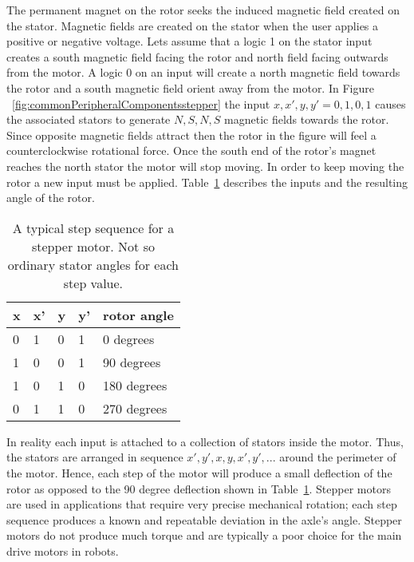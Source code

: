 The permanent magnet on the rotor seeks the induced magnetic field
created on the stator.  Magnetic fields are created on the stator
when the user applies a positive or negative voltage.  Lets assume
that a logic 1 on the stator input creates a south magnetic field facing the rotor
and north field facing outwards from the motor.  A logic 0 on an input
will create a north magnetic field towards the rotor and a south magnetic
field orient away from the motor.  In Figure ~\ref{fig:commonPeripheralComponentsstepper} 
the input $x,x',y,y' = 0,1,0,1$ causes the associated stators to generate
$N,S,N,S$ magnetic fields towards the rotor.  Since opposite magnetic
fields attract then the rotor in the figure will feel a counterclockwise 
rotational force.  Once the south end of the rotor's magnet reaches the
north stator the motor will stop moving.  In order to keep moving
the rotor a new input must be applied.  Table~\ref{table:stepper}
describes the inputs and the resulting angle of the rotor.

\begin{table}
\begin{tabular}{l|l|l|l||l}
x	& x'	& y	& y'	& rotor angle \\ \hline
0	& 1	& 0	& 1	& 0 degrees \\ \hline
1	& 0	& 0	& 1	& 90 degrees \\ \hline
1	& 0	& 1	& 0	& 180 degrees \\ \hline
0	& 1	& 1	& 0	& 270 degrees \\ 
\end{tabular}
\label{table:stepper}
\caption{A typical step sequence for a stepper motor. Not so
ordinary stator angles for each step value.}
\end{table}

In reality each input is attached to a collection of stators inside the motor.  
Thus, the stators are arranged in sequence
$x',y',x,y,x',y',...$ around the perimeter of the motor.  Hence,
each step of the motor will produce a small deflection of the
rotor as opposed to the 90 degree deflection shown in
Table~\ref{table:stepper}.  Stepper motors are used in applications
that require very precise mechanical rotation; each step sequence 
produces a known and repeatable deviation in the axle's angle.
Stepper motors do not produce much torque and are typically a poor
choice for the main drive motors in robots.

